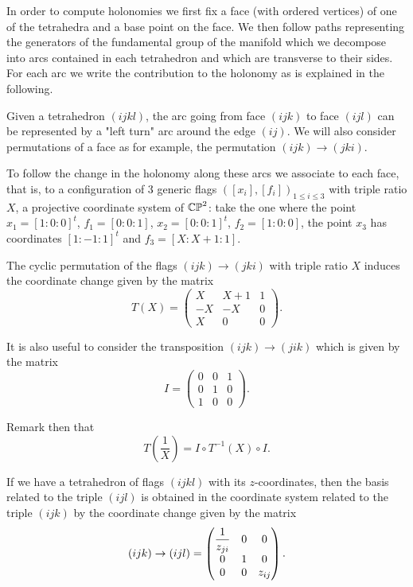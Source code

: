In order to compute holonomies we first fix
a face (with ordered vertices) of one of the tetrahedra and a base point on  the face.  We then follow  paths
representing  the generators of the  fundamental group of the manifold which we decompose  into arcs contained in each tetrahedron
and which are transverse to their sides. For each arc we write the contribution to the holonomy
as is explained in the following.


Given a tetrahedron $(ijkl)$, the  arc going from face $(ijk)$ to face $(ijl)$ can be represented by a "left turn" arc
 around the edge $(ij)$.
We will also consider  permutations of a face as for example, the permutation
$(ijk)\rightarrow (jki)$.


To follow the change in the holonomy  along these arcs we associate to each face, that is, to a configuration of $3$ generic flags $([x_i ] , [f_i ] )_{1 \leq i \leq 3} $
with triple ratio $X$,  a projective
coordinate system   of $\mathbb{CP}^2$: take the one where the point $x_1=[1:0 : 0]^t$, $f_1=[0:0:1]$, $x_2=[0:0:1]^t$, $f_2=[1:0:0]$, the point $x_3$ has coordinates $[1:-1:1]^t$ and $f_3=[X :  X+1 : 1]$.

The cyclic permutation of the flags $(ijk)\rightarrow (jki)$ with triple ratio $X$ induces the coordinate change given
by the matrix
$$T(X) =  \left(
\begin{matrix}
X & X+1 & 1 \\
-X & -X & 0 \\
X & 0 &  0
\end{matrix} \right).$$

It is also useful to consider the transposition $ (ijk)\rightarrow (jik)$
which is given by the matrix
$$
I=\left(
\begin{matrix}
0& 0 & 1\\
0 & 1 & 0 \\
1 & 0 & 0
\end{matrix} \right).$$

Remark then that
$$
 T(\frac{1}{X} )=I\circ  T^{-1}(X)\circ I.
$$


If we have a tetrahedron of flags $(ijkl)$ with its $z$-coordinates, then the  basis
related to the triple $(ijl)$ is obtained in the  coordinate system related to the triple $(ijk)$
by the coordinate change given by the matrix
$$(ijk)\rightarrow (ijl) = \left(
\begin{matrix}
\Frac{1}{z_{ji}}& 0 & 0\\
0 & 1 & 0 \\
0 & 0 & z_{ij}
\end{matrix} \right).$$


